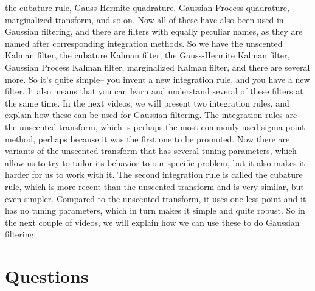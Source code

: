 the cubature rule, Gauss-Hermite quadrature, Gaussian Process
quadrature, marginalized transform, and so on.
Now all of these have also been used in Gaussian filtering,
and there are filters with equally peculiar names,
as they are named after corresponding integration
methods.
So we have the unscented Kalman filter, the cubature Kalman
filter, the Gauss-Hermite Kalman filter, Gaussian Process Kalman
filter, marginalized Kalman filter,
and there are several more.
So it's quite simple--
you invent a new integration rule,
and you have a new filter.
It also means that you can learn and understand
several of these filters at the same time.
In the next videos, we will present two integration rules,
and explain how these can be used for Gaussian filtering.
The integration rules are the unscented transform,
which is perhaps the most commonly used sigma point
method, perhaps because it was the first one to be promoted.
Now there are variants of the unscented transform that
has several tuning parameters, which
allow us to try to tailor its behavior
to our specific problem, but it also makes it harder
for us to work with it.
The second integration rule is called the cubature rule, which
is more recent than the unscented transform
and is very similar, but even simpler.
Compared to the unscented transform,
it uses one less point and it has no tuning parameters,
which in turn makes it simple and quite robust.
So in the next couple of videos, we
will explain how we can use these to do Gaussian filtering.

\section{Questions}

